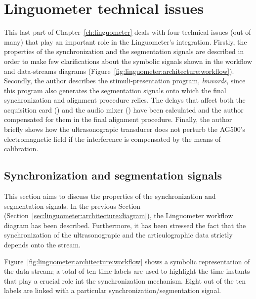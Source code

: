 \section{Linguometer technical issues}
\label{ch:linguometer:technical}
This last part of Chapter~\ref{ch:linguometer} deals with four technical issues
(out of many) that play an important role in the Linguometer's integration.
Firstly, the properties of the  synchronization and the segmentation signals 
are described in order to make few clarifications about the symbolic signals
shown in the workflow and data-streams diagrams
(Figure~\ref{fig:linguometer:architecture:workflow}).
Secondly, the author describes the stimuli-presentation program, \emph{lmwords},
since this program also generates the segmentation signals onto which the final
synchronization and alignment procedure relies.
The delays that affect both the acquisition card () and the audio mixer
() have been calculated and the author compensated for them in the final
alignment procedure.
Finally, the author briefly shows how the ultrasonograpic transducer does not
perturb the AG500's electromagnetic field if the interference is compensated by
the means of calibration.
\subsection{Synchronization and segmentation signals}
\label{sec:linguometer:technical:signals}
This section aims to discuss the properties of the synchronization and
segmentation signals. 
In the previous Section (Section~\ref{sec:linguometer:architecture:diagram}),
the Linguometer workflow diagram has been described. 
Furthermore, it has been stressed the fact that the synchronization of the 
ultrasonograpic and the articulographic data strictly depends onto the 
 stream.


Figure~\ref{fig:linguometer:architecture:workflow} shows a symbolic
representation of the data  stream; 
a total of ten time-labels are used to highlight the time instants that play a
crucial role int the synchronization mechanism. 
Eight out of the ten labels are linked with a particular
synchronization/segmentation signal.

